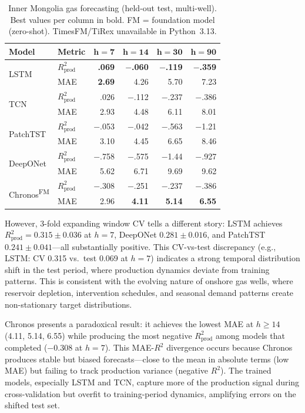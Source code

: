 \documentclass[conference]{IEEEtran}
\begin{document}
\begin{table}[t]
\centering
\caption{Inner Mongolia gas forecasting (held-out test, multi-well). Best values per column in bold. FM = foundation model (zero-shot). TimesFM/TiRex unavailable in Python~3.13.}
\label{tab:inner_mongolia}
\small
\setlength{\tabcolsep}{2.5pt}
\begin{tabular}{@{}ll rrrr @{}}
\toprule
\textbf{Model} & \textbf{Metric} & $\boldsymbol{h{=}7}$ & $\boldsymbol{h{=}14}$ & $\boldsymbol{h{=}30}$ & $\boldsymbol{h{=}90}$ \\
\midrule
\multirow{2}{*}{LSTM}
 & $R^2_\text{prod}$ & \textbf{.069} & \textbf{$-$.060} & \textbf{$-$.119} & \textbf{$-$.359} \\
 & MAE              & \textbf{2.69} & 4.26 & 5.70 & 7.23 \\
\midrule
\multirow{2}{*}{TCN}
 & $R^2_\text{prod}$ & .026 & $-$.112 & $-$.237 & $-$.386 \\
 & MAE              & 2.93 & 4.48 & 6.11 & 8.01 \\
\midrule
\multirow{2}{*}{PatchTST}
 & $R^2_\text{prod}$ & $-$.053 & $-$.042 & $-$.563 & $-$1.21 \\
 & MAE              & 3.10 & 4.45 & 6.65 & 8.46 \\
\midrule
\multirow{2}{*}{DeepONet}
 & $R^2_\text{prod}$ & $-$.758 & $-$.575 & $-$1.44 & $-$.927 \\
 & MAE              & 5.62 & 6.71 & 9.69 & 9.62 \\
\midrule
\multirow{2}{*}{Chronos\textsuperscript{FM}}
 & $R^2_\text{prod}$ & $-$.308 & $-$.251 & $-$.237 & $-$.386 \\
 & MAE              & 2.96 & \textbf{4.11} & \textbf{5.14} & \textbf{6.55} \\
\bottomrule
\end{tabular}
\end{table}

However, 3-fold expanding window CV tells a different story: LSTM achieves $R^2_\text{prod}{=}0.315 \pm 0.036$ at $h{=}7$, DeepONet $0.281 \pm 0.016$, and PatchTST $0.241 \pm 0.041$---all substantially positive. This CV-vs-test discrepancy (e.g., LSTM: CV 0.315 vs.\ test 0.069 at $h{=}7$) indicates a strong temporal distribution shift in the test period, where production dynamics deviate from training patterns. This is consistent with the evolving nature of onshore gas wells, where reservoir depletion, intervention schedules, and seasonal demand patterns create non-stationary target distributions.

Chronos presents a paradoxical result: it achieves the lowest MAE at $h \geq 14$ (4.11, 5.14, 6.55) while producing the most negative $R^2_\text{prod}$ among models that completed ($-$0.308 at $h{=}7$). This MAE-$R^2$ divergence occurs because Chronos produces stable but biased forecasts---close to the mean in absolute terms (low MAE) but failing to track production variance (negative $R^2$). The trained models, especially LSTM and TCN, capture more of the production signal during cross-validation but overfit to training-period dynamics, amplifying errors on the shifted test set.
\end{document}
